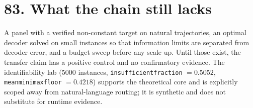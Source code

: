 \documentclass[9pt,twocolumn]{article}
\renewcommand{\_}{\CIGunderscore\allowbreak}
\begin{document}
\section*{83. What the chain still lacks}
A panel with a verified non-constant target on natural trajectories, an optimal decoder solved on small instances so that information limits are separated from decoder error, and a budget sweep before any scale-up. Until those exist, the transfer claim has a positive control and no confirmatory evidence. The identifiability lab ($5000$ instances, \texttt{insufficient\_fraction} $=0.5052$, \texttt{mean\_minimax\_floor} $=0.4218$) supports the theoretical core and is explicitly scoped away from natural-language routing; it is synthetic and does not substitute for runtime evidence.
\end{document}
